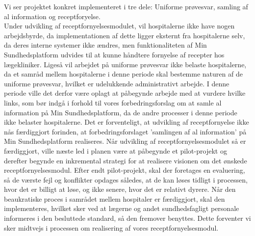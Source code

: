 Vi ser projektet konkret implementeret i tre dele: Uniforme prøvesvar, samling af al information og receptforyelse. \\
Under udvikling af receptfornyelsesmodulet, vil hospitalerne ikke have nogen arbejdsbyrde, da implementationen af dette ligger eksternt fra hospitalerne selv, da deres interne systemer ikke ændres, men funktionaliteten af Min Sundhedsplatform udvides til at kunne håndtere fornyelse af recepter hos lægekliniker. Ligeså vil arbejdet på uniforme prøvesvar ikke belaste hospitalerne, da et samråd mellem hospitalerne i denne periode skal bestemme naturen af de uniforme prøvesvar, hvilket er udelukkende administrativt arbejde. I denne periode ville det derfor være oplagt at påbegynde arbejde med at vurdere hvilke links, som bør indgå i forhold til vores forbedringsforslag om at samle al information på Min Sundhedsplatform, da de andre processer i denne periode ikke belaster hospitalerne. Det er forventeligt, at udvikling af receptfornyelse ikke nås færdiggjort forinden, at forbedringsforslaget 'samlingen af al information' på Min Sundhedsplatform realiseres. Når udvikling af receptfornyelsesmodulet så er færdiggjort, ville næste led i planen være at påbegynde et pilot-projekt og derefter begynde en inkremental strategi for at realisere visionen om det ønskede receptfornyelsesmodul. Efter endt pilot-projekt, skal der foretages en evaluering, så de værste fejl og konflikter opdages således, at de kan løses tidligt i processen, hvor det er billigt at løse, og ikke senere, hvor det er relativt dyrere. 
Når den beaukratiske proces i samrådet mellem hospitaler er færdiggjort, skal den implementeres, hvilket sker ved at lægerne og andet sundhedsfagligt personale informeres i den besluttede standard, så den fremover benyttes. Dette forventer vi sker midtvejs i processen om realisering af vores receptfornyelsesmodul.
